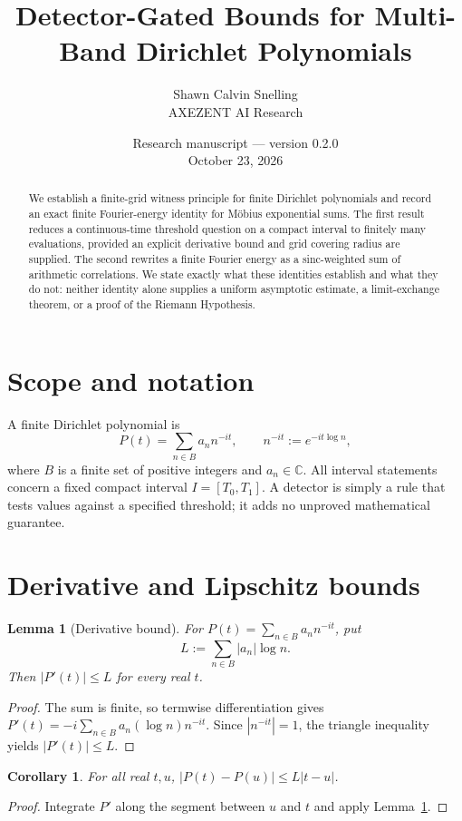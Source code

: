 \documentclass[11pt]{article}
\title{Detector-Gated Bounds for Multi-Band Dirichlet Polynomials}
\author{Shawn Calvin Snelling\\\small AXEZENT AI Research}
\date{Research manuscript --- version 0.2.0\\October 23, 2026}
\newtheorem{lemma}[theorem]{Lemma}
\newtheorem{corollary}[theorem]{Corollary}
\theoremstyle{definition}\newtheorem{definition}[theorem]{Definition}
\theoremstyle{remark}\newtheorem{remark}[theorem]{Remark}
\begin{document}
\maketitle
\begin{abstract}
We establish a finite-grid witness principle for finite Dirichlet polynomials and record an exact finite Fourier-energy identity for Möbius exponential sums. The first result reduces a continuous-time threshold question on a compact interval to finitely many evaluations, provided an explicit derivative bound and grid covering radius are supplied. The second rewrites a finite Fourier energy as a sinc-weighted sum of arithmetic correlations. We state exactly what these identities establish and what they do not: neither identity alone supplies a uniform asymptotic estimate, a limit-exchange theorem, or a proof of the Riemann Hypothesis.
\end{abstract}

\section{Scope and notation}
A finite Dirichlet polynomial is
\[
P(t)=\sum_{n\in B}a_n n^{-it},\qquad n^{-it}:=e^{-it\log n},
\]
where $B$ is a finite set of positive integers and $a_n\in\mathbb C$. All interval statements concern a fixed compact interval $I=[T_0,T_1]$. A detector is simply a rule that tests values against a specified threshold; it adds no unproved mathematical guarantee.

\section{Derivative and Lipschitz bounds}
\begin{lemma}[Derivative bound]\label{lem:deriv}
For $P(t)=\sum_{n\in B}a_n n^{-it}$, put
\[
L:=\sum_{n\in B}|a_n|\log n.
\]
Then $|P'(t)|\le L$ for every real $t$.
\end{lemma}
\begin{proof}
The sum is finite, so termwise differentiation gives
$P'(t)=-i\sum_{n\in B}a_n(\log n)n^{-it}$.
Since $|n^{-it}|=1$, the triangle inequality yields $|P'(t)|\le L$.
\end{proof}
\begin{corollary}\label{cor:lip}
For all real $t,u$, $|P(t)-P(u)|\le L|t-u|$.
\end{corollary}
\begin{proof}
Integrate $P'$ along the segment between $u$ and $t$ and apply Lemma~\ref{lem:deriv}.
\end{proof}
\end{document}
